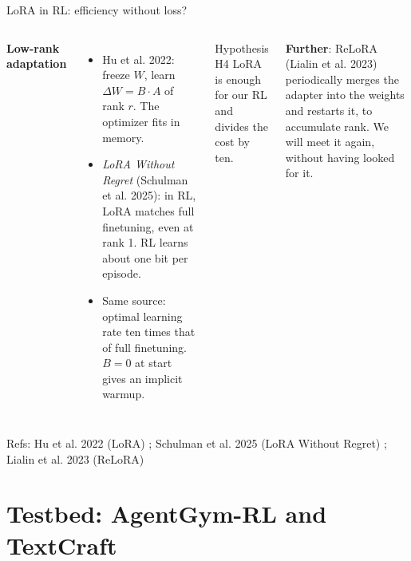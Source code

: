 \documentclass[aspectratio=169,10pt]{beamer}
\newcommand{\refs}[1]{\vfill{\tiny\textcolor{crMid}{Refs: #1}}}
\begin{document}
\begin{frame}{LoRA in RL: efficiency without loss?}
\begin{columns}[T]
\textbf{Low-rank adaptation}
\begin{itemize}
  \item Hu et al. 2022: freeze $W$, learn $\Delta W = B\cdot A$ of rank $r$. The optimizer fits in memory.
  \item \emph{LoRA Without Regret} (Schulman et al. 2025): in RL, LoRA matches full finetuning, even at rank 1. RL learns about one bit per episode.
  \item Same source: optimal learning rate ten times that of full finetuning. $B=0$ at start gives an implicit warmup.
\end{itemize}
\begin{block}{Hypothesis H4}
LoRA is enough for our RL and divides the cost by ten.
\end{block}
\vspace{0.2cm}
\textbf{Further}: ReLoRA (Lialin et al. 2023) periodically merges the adapter into the weights and restarts it, to accumulate rank. We will meet it again, without having looked for it.
\end{columns}
\refs{Hu et al. 2022 (LoRA) ; Schulman et al. 2025 (LoRA Without Regret) ; Lialin et al. 2023 (ReLoRA)}
\end{frame}

\section{Testbed: AgentGym-RL and TextCraft}
\end{document}

